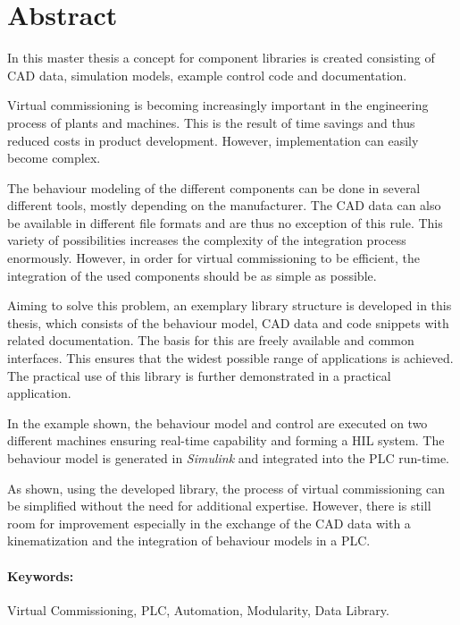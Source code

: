 \section*{Abstract}

In this master thesis a concept for component libraries is created consisting of CAD data, simulation models, example control code and documentation. 

Virtual commissioning is becoming increasingly important in the engineering process of plants and machines. This is the result of time savings and thus reduced costs in product development. However, implementation can easily become complex.

The behaviour modeling of the different components can be done in several different tools, mostly depending on the manufacturer. The CAD data can also be available in different file formats and are thus no exception of this rule. This variety of possibilities increases the complexity of the integration process enormously. However, in order for virtual commissioning to be efficient, the integration of the used components should be as simple as possible.

Aiming to solve this problem, an exemplary library structure is developed in this thesis, which consists of the behaviour model, CAD data and code snippets with related documentation. The basis for this are freely available and common interfaces.
This ensures that the widest possible range of applications is achieved. The practical use of this library is further demonstrated in a practical application. 

In the example shown, the behaviour model and control are executed on two different machines ensuring real-time capability and forming a HIL system. 
The behaviour model is generated in \textit{Simulink} and integrated into the PLC run-time.


As shown, using the developed library, the process of virtual commissioning can be simplified without the need for additional expertise. However, there is still room for improvement especially in the exchange of the CAD data with a kinematization and the integration of behaviour models in a PLC.


\paragraph*{Keywords:} Virtual Commissioning, PLC, Automation, Modularity, Data Library.